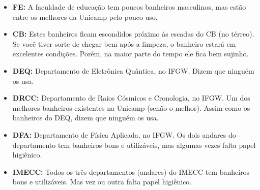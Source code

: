 \begin{itemize}
    \item  \textbf{FE:} A faculdade de educação tem poucos banheiros masculinos,
        mas estão entre os melhores da Unicamp pelo pouco uso.

    \item  \textbf{CB:} Estes banheiros ficam escondidos próximo às escadas do
        CB (no térreo). Se você tiver sorte de chegar bem após a limpeza, o
        banheiro estará em excelentes condições. Porém, na maior parte do tempo
        ele fica bem sujinho.

    \item  \textbf{DEQ:} Departamento de Eletrônica Quântica, no IFGW. Dizem que
        ninguém os usa.

    \item  \textbf{DRCC:} Departamento de Raios Cósmicos e Cronologia, no IFGW.
        Um dos melhores banheiros existentes na Unicamp (senão o melhor). Assim
        como os banheiros do DEQ, dizem que ninguém os usa.

    \item  \textbf{DFA:} Departamento de Física Aplicada, no IFGW. Os dois
        andares do departamento tem banheiros bons e utilizáveis, mas algumas
        vezes falta papel higiênico.

    \item  \textbf{IMECC:} Todos os três departamentos (andares) do IMECC tem
        banheiros bons e utilizáveis. Mas vez ou outra falta papel higiênico.
\end{itemize}
